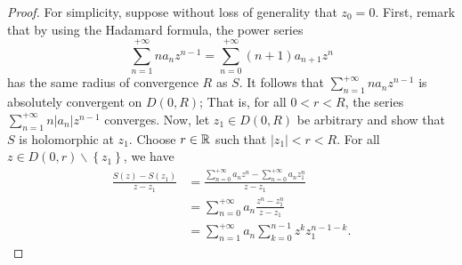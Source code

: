 \begin{proof}
For simplicity, suppose without loss of generality that $z_0 = 0 $. First, remark that 
by using the Hadamard formula, the power series
\[
\sum_{n=1}^{+\infty}  n a_n z^{n-1} = \sum_{n=0}^{+\infty} (n+1) a_{n+1} 
z^n 
\]
has the same radius of convergence $R $ as $S $. It follows that $\sum_{n=1}^{+\infty} n a_n z^{n-1}$ is absolutely
convergent on $D(0, R)$; That is, for all $0 <  r < R$, the series $\sum_{n=1}^{+\infty} n \left| a_n  \right|  z^{n-1}$  converges. 
Now, let $z_1 \in  D(0, R)$ be arbitrary and show that $S $ is holomorphic at $z_1.$ Choose 
$r \in  \mathbb{R}  $ such that $\left| z_1  \right|  <  r < R$. For all $z \in   D(0, r)  \backslash  \left\{ z_1 \right\}$, we have
\begin{align*}
  \frac{S(z) - S(z_1)  }{z - z_1} &= 
  \frac{\sum_{n=0}^{+\infty} a _n z^n  - \sum_{n=0}^{+\infty} a_n z_1^n }{ z - z_1} \\
                                  &= 
                                  \sum_{n=0}^{+\infty} a_n  \frac{z^n - z_1^n }{z - z_1} \\
                                  &= 
                                  \sum_{n=1}^{+\infty} a_n 
                                  \sum_{k=0}^{n-1} z^{k} z_1^{n-1-k}.
\end{align*}
\end{proof}
